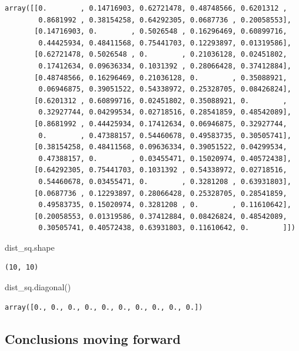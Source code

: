 \documentclass[
  letterpaper,
]{scrbook}
\newenvironment{Shaded}{\begin{snugshade}}{\end{snugshade}}
\newcommand{\NormalTok}[1]{#1}
\begin{document}
\begin{verbatim}
array([[0.        , 0.14716903, 0.62721478, 0.48748566, 0.6201312 ,
        0.8681992 , 0.38154258, 0.64292305, 0.0687736 , 0.20058553],
       [0.14716903, 0.        , 0.5026548 , 0.16296469, 0.60899716,
        0.44425934, 0.48411568, 0.75441703, 0.12293897, 0.01319586],
       [0.62721478, 0.5026548 , 0.        , 0.21036128, 0.02451802,
        0.17412634, 0.09636334, 0.1031392 , 0.28066428, 0.37412884],
       [0.48748566, 0.16296469, 0.21036128, 0.        , 0.35088921,
        0.06946875, 0.39051522, 0.54338972, 0.25328705, 0.08426824],
       [0.6201312 , 0.60899716, 0.02451802, 0.35088921, 0.        ,
        0.32927744, 0.04299534, 0.02718516, 0.28541859, 0.48542089],
       [0.8681992 , 0.44425934, 0.17412634, 0.06946875, 0.32927744,
        0.        , 0.47388157, 0.54460678, 0.49583735, 0.30505741],
       [0.38154258, 0.48411568, 0.09636334, 0.39051522, 0.04299534,
        0.47388157, 0.        , 0.03455471, 0.15020974, 0.40572438],
       [0.64292305, 0.75441703, 0.1031392 , 0.54338972, 0.02718516,
        0.54460678, 0.03455471, 0.        , 0.3281208 , 0.63931803],
       [0.0687736 , 0.12293897, 0.28066428, 0.25328705, 0.28541859,
        0.49583735, 0.15020974, 0.3281208 , 0.        , 0.11610642],
       [0.20058553, 0.01319586, 0.37412884, 0.08426824, 0.48542089,
        0.30505741, 0.40572438, 0.63931803, 0.11610642, 0.        ]])
\end{verbatim}

\begin{Shaded}
\begin{Highlighting}[]
\NormalTok{dist_sq.shape}
\end{Highlighting}
\end{Shaded}

\begin{verbatim}
(10, 10)
\end{verbatim}

\begin{Shaded}
\begin{Highlighting}[]
\NormalTok{dist_sq.diagonal()}
\end{Highlighting}
\end{Shaded}

\begin{verbatim}
array([0., 0., 0., 0., 0., 0., 0., 0., 0., 0.])
\end{verbatim}

\hypertarget{conclusions-moving-forward}{%
\subsection{Conclusions moving forward}\label{conclusions-moving-forward}}
\end{document}
